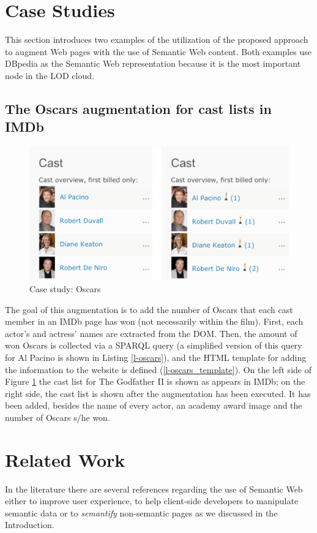 \documentclass[runningheads]{llncs}
\begin{document}
\section{Case Studies}
\label{sec-casestudies}

This section introduces two examples of the utilization of the proposed approach to augment Web pages with the use of Semantic Web content. Both examples use DBpedia as the Semantic Web representation because it is the most important node in the LOD cloud\cite{DBpediaJournal}. 

\subsection{The Oscars augmentation for cast lists in IMDb}
\label{sec-imdb}


\begin{figure}
  \centering
    \includegraphics[width=1.0\linewidth]{oscars6.png}
    \caption{Case study: Oscars}
    \label{fig-oscars}
\end{figure}

The goal of this augmentation is to add the number of Oscars that each cast member in an IMDb page has won (not necessarily within the film). First, each actor's and actress' names are extracted from the DOM. Then, the amount of won Oscars is collected via a SPARQL query (a simplified version of this query for Al Pacino is shown in Listing \ref{l-oscars}), and the HTML template for adding the information to the website is defined (\ref{l-oscars_template}). On the left side of Figure \ref{fig-oscars} the cast list for The Godfather II is shown as appears in IMDb; on the right side, the cast list is shown after the augmentation has been executed. It has been added, besides the name of every actor, an academy award image and the number of Oscars s/he won. 


\section{Related Work}
\label{sec-related_work}
In the literature there are several references regarding the use of Semantic Web either to improve user experience, to help client-side developers to manipulate semantic data or to \textit{semantify} non-semantic pages as we discussed in the Introduction. 
\end{document}
